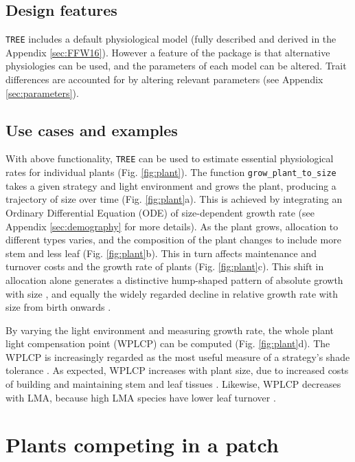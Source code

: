 \documentclass[a4paper,11pt]{article}
\begin{document}
\subsection{Design features}

\texttt{TREE} includes a default physiological model (fully described and derived
in the Appendix \ref{sec:FFW16}). However a feature of the package is that alternative
physiologies can be used, and the parameters of each model can be
altered. Trait differences are accounted for by altering relevant
parameters (see Appendix \ref{sec:parameters}).

\subsection{Use cases and examples}

With above functionality, \texttt{TREE} can be used to estimate essential
physiological rates for individual plants (Fig. \ref{fig:plant}). The
function \texttt{grow\_plant\_to\_size} takes a given strategy and light
environment and grows the plant, producing a trajectory of size over
time (Fig. \ref{fig:plant}a). This is achieved by integrating an
Ordinary Differential Equation (ODE) of size-dependent growth rate (see
Appendix \ref{sec:demography} for more
details). As the plant grows, allocation to different types varies, and
the composition of the plant changes to include more stem and less
leaf (Fig. \ref{fig:plant}b). This in turn affects maintenance and
turnover costs and the growth rate of plants (Fig. \ref{fig:plant}c).
This shift in allocation alone generates a distinctive hump-shaped pattern of absolute
growth with size \citep{King-2011}, and equally the widely regarded
decline in relative growth rate with size from birth onwards
\citep{Enquist-2007}.

By varying the light environment and measuring growth rate, the whole
plant light compensation point (WPLCP) can be computed (Fig.
\ref{fig:plant}d). The WPLCP is increasingly regarded as the most useful
measure of a strategy's shade tolerance
\citep{Givnish-1988, Baltzer-2007, Lusk-2013}. As expected, WPLCP
increases with plant size, due to increased costs of building and
maintaining stem and leaf tissues \citep{Givnish-1988}. Likewise, WPLCP
decreases with LMA, because high LMA species have lower leaf turnover
\citep{Baltzer-2007, Lusk-2013}.

\section{Plants competing in a patch}
\end{document}
